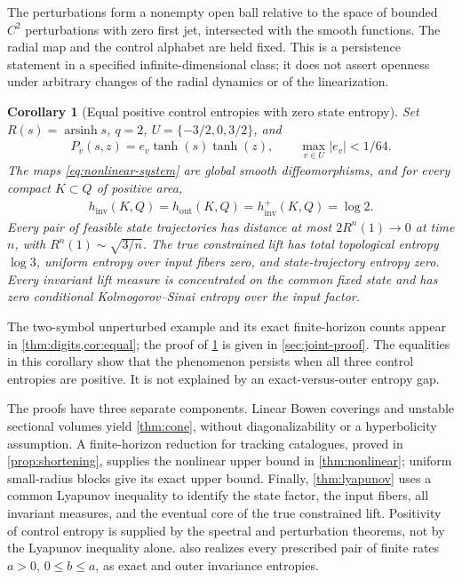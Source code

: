 \documentclass[11pt,a4paper]{article}
\newtheorem{corollary}[theorem]{Corollary}
\theoremstyle{definition}
\theoremstyle{remark}
\begin{document}
The perturbations form a nonempty open ball relative to the space of bounded \(C^2\) perturbations with zero first jet, intersected with the smooth functions. The radial map and the control alphabet are held fixed. This is a persistence statement in a specified infinite-dimensional class; it does not assert openness under arbitrary changes of the radial dynamics or of the linearization.
\begin{corollary}[Equal positive control entropies with zero state entropy]\label{cor:joint}
Set \(R(s)=\operatorname{arsinh}s\), \(q=2\), \(U=\{-3/2,0,3/2\}\), and
\begin{align}\label{eq:explicit-nonlinear}
 P_v(s,z)=e_v\tanh(s)\tanh(z),\qquad
 \max_{v\in U}|e_v|<1/64.
\end{align}
The maps \eqref{eq:nonlinear-system} are global smooth diffeomorphisms, and for every compact \(K\subset Q\) of positive area,
\begin{align}
 h_{\mathrm{inv}}(K,Q)=h_{\mathrm{out}}(K,Q)
 =h_{\mathrm{inv}}^+(K,Q)=\log2.
\end{align}
Every pair of feasible state trajectories has distance at most
\(2R^n(1)\to0\) at time \(n\), with \(R^n(1)\sim\sqrt{3/n}\).
The true constrained lift has total topological entropy \(\log3\), uniform entropy over input fibers zero, and state-trajectory entropy zero. Every invariant lift measure is concentrated on the common fixed state and has zero conditional Kolmogorov--Sinai entropy over the input factor.
\end{corollary}

The two-symbol unperturbed example and its exact finite-horizon counts appear in \cref{thm:digits,cor:equal}; the proof of \cref{cor:joint} is given in \cref{sec:joint-proof}. The equalities in this corollary show that the phenomenon persists when all three control entropies are positive. It is not explained by an exact-versus-outer entropy gap.

The proofs have three separate components. Linear Bowen coverings and unstable sectional volumes yield \cref{thm:cone}, without diagonalizability or a hyperbolicity assumption. A finite-horizon reduction for tracking catalogues, proved in \cref{prop:shortening}, supplies the nonlinear upper bound in \cref{thm:nonlinear}; uniform small-radius blocks give its exact upper bound. Finally, \cref{thm:lyapunov} uses a common Lyapunov inequality to identify the state factor, the input fibers, all invariant measures, and the eventual core of the true constrained lift. Positivity of control entropy is supplied by the spectral and perturbation theorems, not by the Lyapunov inequality alone.  also realizes every prescribed pair of finite rates \(a>0\), \(0\leq b\leq a\), as exact and outer invariance entropies.
\end{document}
